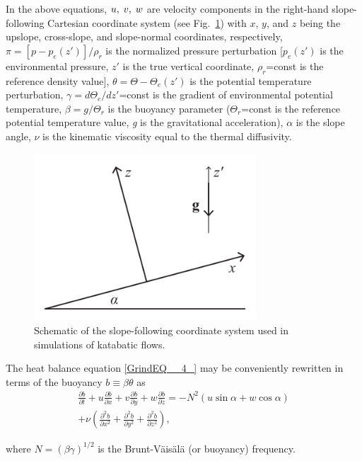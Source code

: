 \documentclass[gmd]{copernicus}
\begin{document}
\noindent  In the above equations, $u,{\rm \; }v,{\rm \; }w$ are velocity components in the right-hand slope-following Cartesian coordinate system (see Fig.~\ref{Figure_coord}) with $x$, $y$, and $z$ being the upslope, cross-slope, and slope-normal coordinates, respectively, $\pi =[p-p_{e} (z')]/\rho _{r} $ is the normalized pressure perturbation [$p_{e} (z')$ is the environmental pressure, $z'$ is the true vertical coordinate, $\rho _{r} $=const is the reference density value], $\theta =\Theta -\Theta _{e} (z')$ is the potential temperature perturbation, $\gamma =d\Theta _{e} /dz'$=const is the gradient of environmental potential temperature, $\beta =g/\Theta _{r} $ is the buoyancy parameter ($\Theta _{r} $=const is the reference potential temperature value, \textit{g} is the gravitational acceleration), $\alpha $ is the slope angle, $\nu $ is the kinematic viscosity equal to the thermal diffusivity.

\begin{figure}
\centerline{\includegraphics[width=8.3cm]{figs/Figure_coord.pdf}}
\caption{Schematic of the slope-following coordinate system used in simulations of katabatic flows.}
\label{Figure_coord}
\end{figure}

The heat balance equation \eqref{GrindEQ__4_} may be conveniently rewritten in terms of the buoyancy $b\equiv \beta \theta $ as
\begin{eqnarray} \label{GrindEQ__6_} 
\nonumber \frac{\partial b}{\partial t} +u\frac{\partial b}{\partial x} +v\frac{\partial b}{\partial y} +w\frac{\partial b}{\partial z} =-N^{2} (u\sin \alpha +w\cos \alpha )\\+\nu \left(\frac{\partial ^{2} b}{\partial x^{2} } +\frac{\partial ^{2} b}{\partial y^{2} } +\frac{\partial ^{2} b}{\partial z^{2} } \right),  
\end{eqnarray} 

\noindent  where $N=(\beta \gamma )^{1/2} $ is the Brunt-V\"{a}is\"{a}l\"{a} (or buoyancy) frequency.
\end{document}
